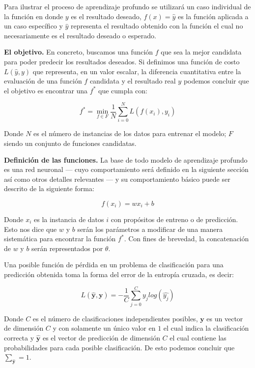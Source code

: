Para ilustrar el proceso de aprendizaje profundo se utilizará un caso individual de la función en donde $y$ es el resultado deseado, $f(x) = \hat{y}$ es la función aplicada a un caso específico y $\hat{y}$ representa el resultado obtenido con la función el cual no necesariamente es el resultado deseado o esperado.

\textbf{El objetivo.} En concreto, buscamos una función $f$ que sea la mejor candidata para poder predecir los resultados deseados. Si definimos una función de costo $L(\hat{y}, y)$ que representa, en un valor escalar, la diferencia cuantitativa entre la evaluación de una función $f$ candidata y el resultado real $y$ podemos concluir que el objetivo es encontrar una $f^*$ que cumpla con:

\[ f^* = \min_{f \in F} \frac{1}{N} \sum_{i = 0}^{N} L(f(x_i), y_i) \]

Donde $N$ es el número de instancias de los datos para entrenar el modelo; $F$ siendo un conjunto de funciones candidatas.

\textbf{Definición de las funciones.} La base de todo modelo de aprendizaje profundo es una red neuronal --- cuyo comportamiento será definido en la siguiente sección así como otros detalles relevantes --- y su comportamiento básico puede ser descrito de la siguiente forma:

\[ f(x_i) = w x_i + b \]

Donde $x_i$ es la instancia de datos $i$ con propósitos de entreno o de predicción. Esto nos dice que $w$ y $b$ serán los parámetros a modificar de una manera sistemática para encontrar la función $f^*$. Con fines de brevedad, la concatenación de $w$ y $b$ serán representados por $\theta$.

Una posible función de pérdida en un problema de clasificación para una predicción obtenida toma la forma del error de la entropía cruzada, es decir:

\begin{equation}
\label{eq:crossentropy}
L(\mathbf{\hat{y}}, \mathbf{y}) = - \frac{1}{C} \sum_{j = 0}^{C} y_j log \left( \hat{y_j} \right)
\end{equation}

Donde $C$ es el número de clasificaciones independientes posibles, $\mathbf{y}$ es un vector de dimensión $C$ y con solamente un único valor en $1$ el cual indica la clasificación correcta y $\mathbf{\hat{y}}$ es el vector de predicción de dimensión $C$ el cual contiene las probabilidades para cada posible clasificación. De esto podemos concluir que $\sum_{\mathbf{\hat{y}}} = 1$.

